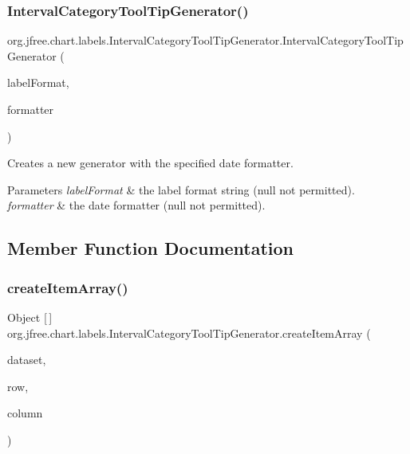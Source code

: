 \subsubsection{\texorpdfstring{Interval\+Category\+Tool\+Tip\+Generator()}{IntervalCategoryToolTipGenerator()}\hspace{0.1cm}{\footnotesize\ttfamily [3/3]}}
{\footnotesize\ttfamily org.\+jfree.\+chart.\+labels.\+Interval\+Category\+Tool\+Tip\+Generator.\+Interval\+Category\+Tool\+Tip\+Generator (\begin{DoxyParamCaption}\item[{String}]{label\+Format,  }\item[{Date\+Format}]{formatter }\end{DoxyParamCaption})}

Creates a new generator with the specified date formatter.


\begin{DoxyParams}{Parameters}
{\em label\+Format} & the label format string ({\ttfamily null} not permitted). \\
\hline
{\em formatter} & the date formatter ({\ttfamily null} not permitted). \\
\hline
\end{DoxyParams}


\subsection{Member Function Documentation}
\mbox{\label{classorg_1_1jfree_1_1chart_1_1labels_1_1_interval_category_tool_tip_generator_a09a1579e16222ed22ff71760146e79c1}} 
\subsubsection{\texorpdfstring{create\+Item\+Array()}{createItemArray()}}
{\footnotesize\ttfamily Object \mbox{[}$\,$\mbox{]} org.\+jfree.\+chart.\+labels.\+Interval\+Category\+Tool\+Tip\+Generator.\+create\+Item\+Array (\begin{DoxyParamCaption}\item[{\mbox{\hyperlink{interfaceorg_1_1jfree_1_1data_1_1category_1_1_category_dataset}{Category\+Dataset}}}]{dataset,  }\item[{int}]{row,  }\item[{int}]{column }\end{DoxyParamCaption})\hspace{0.3cm}{\ttfamily [protected]}}

